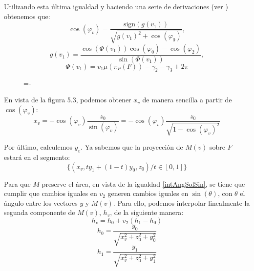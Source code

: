 Utilizando esta última igualdad y haciendo una serie de derivaciones (ver \cite{Urena2013}) obtenemos que:
$$\cos(\varphi_v) = \frac{\text{sign}(g(v_1))}{\sqrt{g(v_1)^2+\cos(\varphi_0)}}, $$
$$g(v_1) = \frac{\cos(\Phi(v_1))\cos(\varphi_0) - \cos(\varphi_2)}{\sin(\Phi(v_1))}, $$
$$\Phi(v_1) = v_1\mu(\pi_P(F))-\gamma_2-\gamma_3+2\pi$$


\begin{figure}[h]
  \lineskip=-\fboxrule
\end{figure}

En vista de la figura 5.3, podemos obtener $x_v$ de manera sencilla a partir de $\cos(\varphi_v)$:
$$x_v = -\cos(\varphi_v)\frac{z_0}{\sin(\varphi_v)} = -\cos(\varphi_v)\frac{z_0}{\sqrt{1-\cos(\varphi_v)^2}} $$

Por último, calculemos $y_v$. Ya sabemos que la proyección de $M(v)$ sobre $F$ estará en el segmento:
$$\{(x_v, t y_1 + (1-t) y_0, z_0) / t\in [0,1]\}$$

Para que $M$ preserve el área, en vista de la igualdad \ref{intAngSolSin}, se tiene que cumplir que cambios iguales en $v_2$ generen cambios iguales en $\sin(\theta)$, con $\theta$ el ángulo entre los vectores $y$ y $M(v)$. Para ello, podemos interpolar linealmente la segunda componente de $M(v)$, $h_v$, de la siguiente manera:
$$h_v = h_0 + v_2(h_1-h_0) $$
$$h_0=\frac{y_0}{\sqrt{x_v^2+z_0^2+y_0^2}} $$
$$h_1=\frac{y_1}{\sqrt{x_v^2+z_0^2+y_1^2}}$$

